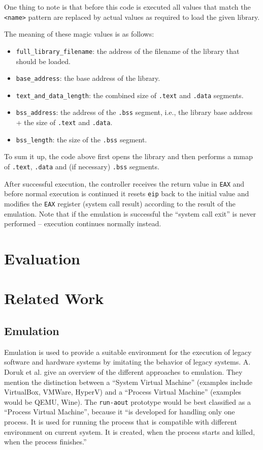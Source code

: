 \documentclass[draft,final]{vutinfth} %
\begin{document}
One thing to note is that before this code is executed all values that match the \texttt{<name>} pattern are replaced by actual values as required to load the given library.

The meaning of these magic values is as follows:
\begin{itemize}
    \item \texttt{full\_library\_filename}: the address of the filename of the library that should be loaded.
    \item \texttt{base\_address}: the base address of the library.
    \item \texttt{text\_and\_data\_length}: the combined size of \texttt{.text} and \texttt{.data} segments.
    \item \texttt{bss\_address}: the address of the \texttt{.bss} segment, i.e., the library base address + the size of \texttt{.text} and \texttt{.data}.
    \item \texttt{bss\_length}: the size of the \texttt{.bss} segment.
\end{itemize}

To sum it up, the code above first opens the library and then performs a mmap of \texttt{.text}, \texttt{.data} and (if necessary) \texttt{.bss} segments.

After successful execution, the controller receives the return value in \texttt{EAX} and before normal execution is continued it resets \texttt{eip} back to the initial value and modifies the \texttt{EAX} register (system call result) according to the result of the emulation. Note that if the emulation is successful the ``system call exit'' is never performed -- execution continues normally instead.

\chapter{Evaluation}



\chapter{Related Work}

\section{Emulation}

Emulation is used to provide a suitable environment for the execution of legacy software and hardware systems by imitating the behavior of legacy systems. \cite{dorukdesign} A. Doruk et al. give an overview of the different approaches to emulation. They mention the distinction between a ``System Virtual Machine'' (examples include VirtualBox, VMWare, HyperV) and a ``Process Virtual Machine'' (examples would be QEMU, Wine). The \texttt{run-aout} prototype would be best classified as a ``Process Virtual Machine'', because it ``is developed for
handling only one process. It is used for
running the process that is compatible with
different environment on current system. It is
created, when the process starts and killed,
when the process finishes.'' \cite[2]{dorukdesign}
\end{document}
